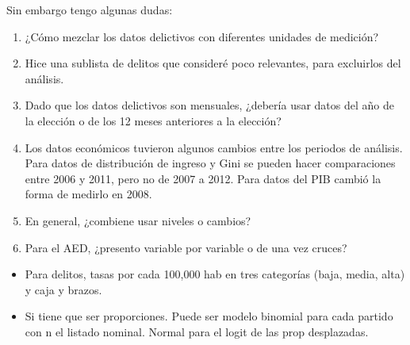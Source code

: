 Sin embargo tengo algunas dudas: 

\begin{enumerate}
\item ¿Cómo mezclar los datos delictivos con diferentes unidades de medición? 
\item Hice una sublista de delitos que consideré poco relevantes, para excluirlos del análisis. 
\item Dado que los datos delictivos son mensuales, ¿debería usar datos del año de la elección o de los 12 meses anteriores a la elección?
\item Los datos económicos tuvieron algunos cambios entre los periodos de análisis. Para datos de distribución de ingreso y Gini se pueden hacer comparaciones entre 2006 y 2011, pero no de 2007 a 2012. Para datos del PIB cambió la forma de medirlo en 2008. 
\item En general, ¿combiene usar niveles o cambios?
\item Para el AED, ¿presento variable por variable o de una vez cruces?
\end{enumerate}

\begin{itemize}
\item Para delitos, tasas por cada 100,000 hab en tres categorías (baja, media, alta) y caja y brazos. 
\item Si tiene que ser proporciones. Puede ser modelo binomial para cada partido con n el listado nominal. Normal para el logit de las prop desplazadas. 
\end{itemize}

